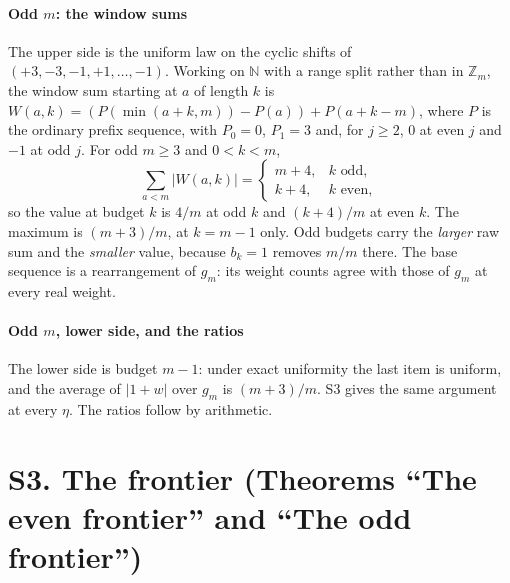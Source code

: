 
\paragraph{Odd $m$: the window sums} The upper side is the uniform law on the cyclic shifts
of $(+3,-3,-1,+1,\dots,-1)$. Working on $\mathbb{N}$ with a range split rather than in
$\mathbb{Z}_{m}$, the window sum starting at $a$ of length $k$ is
$W(a,k)=(P(\min(a+k,m))-P(a))+P(a+k-m)$, where $P$ is the ordinary prefix sequence, with
$P_{0}=0$, $P_{1}=3$ and, for $j\ge2$, $0$ at even $j$ and $-1$ at odd $j$. For odd $m\ge3$
and $0<k<m$,
\[
\sum_{a<m}|W(a,k)|=\begin{cases}m+4,&k\text{ odd},\\ k+4,&k\text{ even},\end{cases}
\]
so the value at budget $k$ is $4/m$ at odd $k$ and $(k+4)/m$ at even $k$. The maximum is
$(m+3)/m$, at $k=m-1$ only. Odd budgets carry the \emph{larger} raw sum and the
\emph{smaller} value, because $b_{k}=1$ removes $m/m$ there. The base sequence is a
rearrangement of $g_{m}$: its weight counts agree with those of $g_{m}$ at every real
weight.


\paragraph{Odd $m$, lower side, and the ratios} The lower side is budget $m-1$: under
exact uniformity the last item is uniform, and the average of $|1+w|$ over $g_{m}$ is
$(m+3)/m$. S3 gives the same argument at every $\eta$. The ratios follow by arithmetic.


\section{S3. The frontier (Theorems ``The even frontier'' and ``The odd frontier'')}

